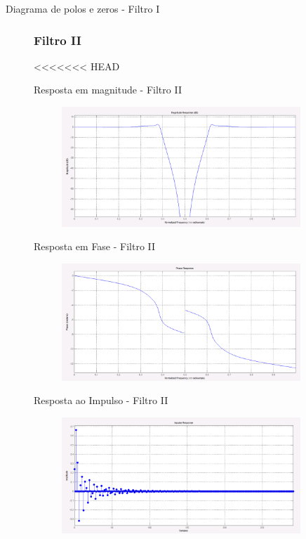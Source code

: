 \documentclass{beamer}
\begin{document}
\begin{frame}{Diagrama de polos e zeros - Filtro I}
\begin{figure}[ht]
\subsubsection{Filtro II}
<<<<<<< HEAD
	\begin{frame}{Resposta em magnitude - Filtro II}
		\begin{figure}[ht]
			\centering
			\includegraphics[width=9cm]{../pictures/Filtro2/RespMagnitudeFiltro2.png}
			\label{fig:magnitude1}
		\end{figure}
	\end{frame}
	\begin{frame}{Resposta em Fase - Filtro II}
		\begin{figure}[ht]
			\centering
			\includegraphics[width=9cm]{../pictures/Filtro2/RespFaseFiltro2.png}
			\label{fig:magnitude1}
		\end{figure}
	\end{frame}
	\begin{frame}{Resposta ao Impulso - Filtro II}
		\begin{figure}[ht]
			\centering
			\includegraphics[width=9cm]{../pictures/Filtro2/RespImpulsoFiltro2.png}
			\label{fig:magnitude1}
		\end{figure}

\end{frame}
\end{figure}
\end{frame}
\end{document}
